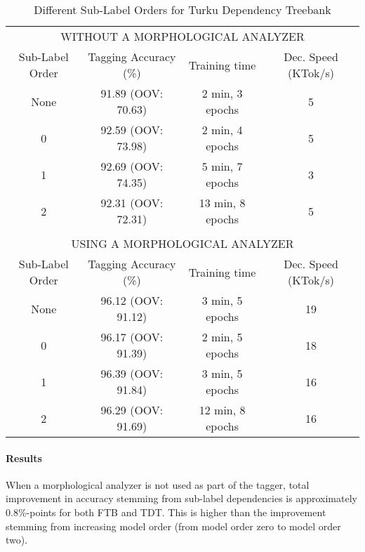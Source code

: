 \begin{table}[htb!]
\begin{center}
\begin{tabular}{c|c|c|c}
\multicolumn{4}{c}{{\small\uppercase{Without a Morphological Analyzer}}}\\
\noalign{\smallskip}
\hline
Sub-Label Order & Tagging Accuracy (\%) & Training time    & Dec. Speed (KTok/s)\\
\hline
None            & 91.89 (OOV: 70.63)    & 2 min, 3 epochs  & 5                       \\
0               &  92.59 (OOV: 73.98)   & 2 min, 4 epochs  & 5                       \\
1               &  92.69 (OOV: 74.35)   & 5 min, 7 epochs  & 3                       \\
2               &  92.31 (OOV: 72.31)   & 13 min, 8 epochs  & 5                       \\
\multicolumn{4}{c}{ }\\%
\multicolumn{4}{c}{{\small USING A MORPHOLOGICAL ANALYZER}}\\
\noalign{\smallskip}
\hline
Sub-Label Order & Tagging Accuracy (\%) & Training time    & Dec. Speed (KTok/s)\\
\hline
None            &  96.12 (OOV: 91.12)   & 3 min, 5 epochs  & 19                       \\
0               &  96.17 (OOV: 91.39)   & 2 min, 5 epochs  & 18                       \\
1               &  96.39 (OOV: 91.84)   & 3 min, 5 epochs  & 16                       \\
2               &  96.29 (OOV: 91.69)   & 12 min, 8 epochs  & 16                       \\
\end{tabular}
\caption{Different Sub-Label Orders for Turku Dependency Treebank}\label{tab:tdt-sl-res}
\end{center}
\end{table}


\paragraph{Results} When a morphological analyzer is not used as part
of the tagger, total improvement in accuracy stemming from sub-label
dependencies is approximately 0.8\%-points for both FTB and TDT. This
is higher than the improvement stemming from increasing model order
(from model order zero to model order two).

